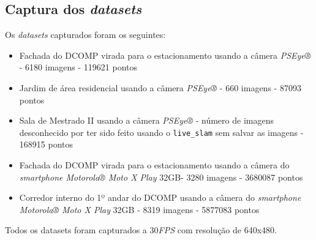 \subsection{Captura dos \textit{datasets}}

Os \textit{datasets} capturados foram os seguintes:

\begin{itemize}
	\item{Fachada do DCOMP virada para o estacionamento usando a câmera \textit{PSEye®} - 6180 imagens - 119621 pontos}
	\item{Jardim de área residencial usando a câmera \textit{PSEye®} - 660 imagens - 87093 pontos}
	\item{Sala de Mestrado II usando a câmera \textit{PSEye®} - número de imagens desconhecido por ter sido feito usando o \texttt{live\_slam} sem salvar as imagens - 168915 pontos}
	\item{Fachada do DCOMP virada para o estacionamento usando a câmera do \textit{smartphone Motorola® Moto X Play} 32GB- 3280 imagens - 3680087 pontos}
	\item{Corredor interno do 1º andar do DCOMP usando a câmera do \textit{smartphone Motorola® Moto X Play} 32GB - 8319 imagens  - 5877083 pontos}
\end{itemize}

Todos os datasets foram capturados a 30\textit{FPS} com resolução de 640x480.

